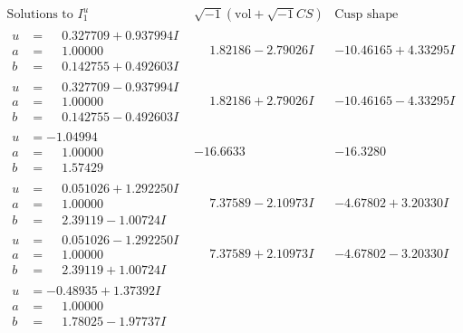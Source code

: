 \documentclass[1p]{elsarticle_modified}
\theoremstyle{definition}
\newcommand{\I}{\sqrt{-1}}
\begin{document}
$$\begin{array}{c|c|c}  
\text{Solutions to }I^u_{1}& \I (\text{vol} + \sqrt{-1}CS) & \text{Cusp shape}\\
 \hline 
\begin{aligned}
u &= \phantom{-}0.327709 + 0.937994 I \\
a &= \phantom{-}1.00000\phantom{ +0.000000I} \\
b &= \phantom{-}0.142755 + 0.492603 I\end{aligned}
 & \phantom{-}1.82186 - 2.79026 I & -10.46165 + 4.33295 I \\ \hline\begin{aligned}
u &= \phantom{-}0.327709 - 0.937994 I \\
a &= \phantom{-}1.00000\phantom{ +0.000000I} \\
b &= \phantom{-}0.142755 - 0.492603 I\end{aligned}
 & \phantom{-}1.82186 + 2.79026 I & -10.46165 - 4.33295 I \\ \hline\begin{aligned}
u &= -1.04994\phantom{ +0.000000I} \\
a &= \phantom{-}1.00000\phantom{ +0.000000I} \\
b &= \phantom{-}1.57429\phantom{ +0.000000I}\end{aligned}
 & -16.6633\phantom{ +0.000000I} & -16.3280\phantom{ +0.000000I} \\ \hline\begin{aligned}
u &= \phantom{-}0.051026 + 1.292250 I \\
a &= \phantom{-}1.00000\phantom{ +0.000000I} \\
b &= \phantom{-}2.39119 - 1.00724 I\end{aligned}
 & \phantom{-}7.37589 - 2.10973 I & -4.67802 + 3.20330 I \\ \hline\begin{aligned}
u &= \phantom{-}0.051026 - 1.292250 I \\
a &= \phantom{-}1.00000\phantom{ +0.000000I} \\
b &= \phantom{-}2.39119 + 1.00724 I\end{aligned}
 & \phantom{-}7.37589 + 2.10973 I & -4.67802 - 3.20330 I \\ \hline\begin{aligned}
u &= -0.48935 + 1.37392 I \\
a &= \phantom{-}1.00000\phantom{ +0.000000I} \\
b &= \phantom{-}1.78025 - 1.97737 I\end{aligned}

\end{array}$$
\end{document}
